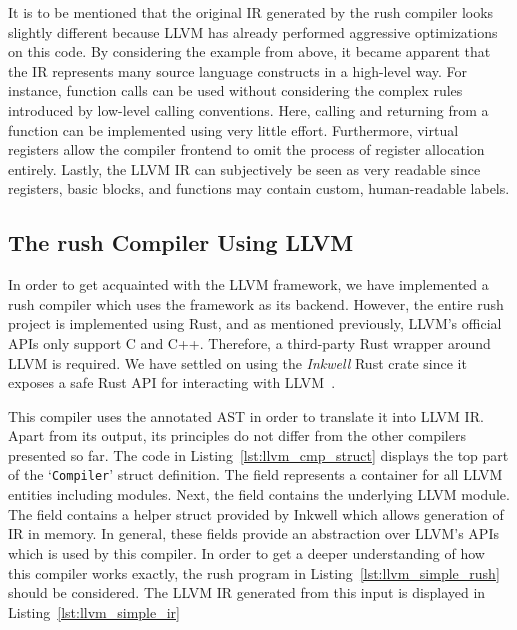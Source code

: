 It is to be mentioned that the original IR generated by the rush compiler looks slightly different because LLVM has already performed aggressive optimizations on this code.
By considering the example from above, it became apparent that the IR represents many source language constructs in a high-level way.
For instance, function calls can be used without considering the complex rules introduced by low-level calling conventions.
Here, calling and returning from a function can be implemented using very little effort.
Furthermore, virtual registers allow the compiler frontend to omit the process of register allocation entirely.
Lastly, the LLVM IR can subjectively be seen as very readable since registers, basic blocks, and functions may contain custom, human-readable labels.

\subsection{The rush Compiler Using LLVM}

In order to get acquainted with the LLVM framework, we have implemented a rush compiler which uses the framework as its backend.
However, the entire rush project is implemented using Rust, and as mentioned previously, LLVM's official APIs only support C and C++.
Therefore, a third-party Rust wrapper around LLVM is required.
We have settled on using the \emph{Inkwell} Rust crate since it exposes a safe Rust API for interacting with LLVM~\cite{Inkwell2023}.


This compiler uses the annotated AST in order to translate it into LLVM IR\@.
Apart from its output, its principles do not differ from the other compilers presented so far.
The code in Listing~\ref{lst:llvm_cmp_struct} displays the top part of the `\texttt{Compiler}' struct definition.
The  field represents a container for all LLVM entities including modules.
Next, the  field contains the underlying LLVM module.
The  field contains a helper struct provided by Inkwell which allows generation of IR in memory.
In general, these fields provide an abstraction over LLVM's APIs which is used by this compiler.
In order to get a deeper understanding of how this compiler works exactly, the rush program in Listing~\ref{lst:llvm_simple_rush} should be considered.
The LLVM IR generated from this input is displayed in Listing~\ref{lst:llvm_simple_ir}


